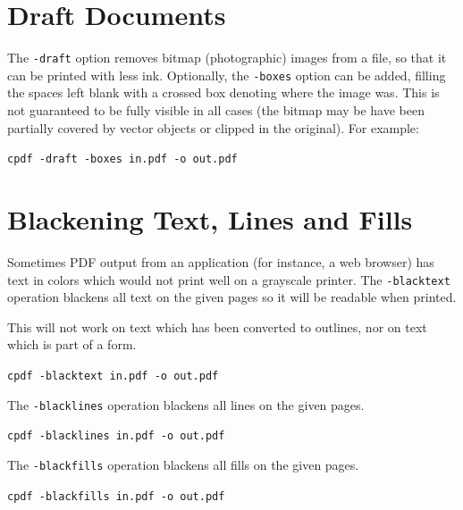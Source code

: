 \documentclass[a4paper,makeidx]{memoir}
\begin{document}
  \section{Draft Documents}
    The \texttt{-draft} option removes bitmap (photographic) images from a
file, so that it can be printed with less ink. Optionally, the
\texttt{-boxes} option can be added, filling the spaces left blank with a
crossed box denoting where the image was. This is not guaranteed to be fully
visible in all cases (the bitmap may be have been partially covered by vector
objects or clipped in the original). For example:
  \begin{framed}
    \small\verb!cpdf -draft -boxes in.pdf -o out.pdf!
  \end{framed}

  \section{Blackening Text, Lines and Fills}
  Sometimes PDF output from an application (for instance, a web browser) has
text in colors which would not print well on a grayscale printer. The
\texttt{-blacktext} operation blackens all text on the given pages so it will be readable
when printed.

  This will not work on text which has been converted to outlines, nor on text
which is part of a form.
  \begin{framed}
    \small\verb!cpdf -blacktext in.pdf -o out.pdf!
  \end{framed}


\noindent The \texttt{-blacklines} operation blackens all lines on the given pages.

  \begin{framed}
    \small\verb!cpdf -blacklines in.pdf -o out.pdf!
  \end{framed}


\noindent The \texttt{-blackfills} operation blackens all fills on the given pages.

  \begin{framed}
    \small\verb!cpdf -blackfills in.pdf -o out.pdf!
  \end{framed}
\end{document}
